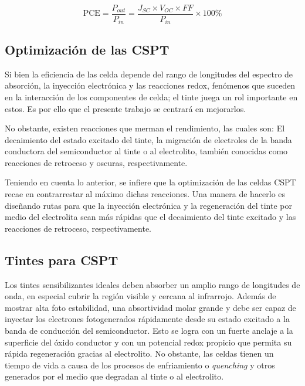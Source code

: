 \begin{equation}
    \text{PCE} = \frac{P_{out}}{P_{in}}  =\frac{J_{SC}\times V_{OC} \times FF}{P_{in}} \times 100\%
    \label{eqn:pce}
\end{equation}


\subsection{Optimización de las CSPT}

Si bien la eficiencia de las celda depende del rango de longitudes del espectro de absorción, la inyección electrónica y las reacciones redox, fenómenos que suceden en la interacción de los componentes de celda; el tinte juega un rol importante en estos. Es por ello que el presente trabajo se centrará en mejorarlos.

No obstante, existen reacciones que merman el rendimiento, las cuales son: El decaimiento del estado excitado del tinte, la migración de electroles de la banda conductora del semiconductor al tinte o al electrolito, también conocidas como reacciones de retroceso y oscuras, respectivamente. 

Teniendo en cuenta lo anterior, se infiere que la optimización de las celdas CSPT recae en contrarrestar al máximo dichas reacciones. Una manera de hacerlo es diseñando rutas para que la inyección electrónica y la regeneración del tinte por medio del electrolita sean más rápidas que el decaimiento del tinte excitado y las reacciones de retroceso, respectivamente. 




\subsection{Tintes para CSPT}

Los tintes sensibilizantes ideales deben absorber un amplio rango de longitudes de onda, en especial cubrir la región visible y cercana al infrarrojo. Además de mostrar alta foto estabilidad, una absortividad molar grande y debe ser capaz de inyectar los electrones fotogenerados rápidamente desde su estado excitado a la banda de conducción del semiconductor. Esto se logra con un fuerte anclaje a la superficie del óxido conductor y con un potencial redox propicio que permita su rápida regeneración gracias al electrolito. No obstante, las celdas tienen un tiempo de vida a causa de los procesos de enfriamiento o \textit{quenching} y otros generados por el medio que degradan al tinte o al electrolito.


